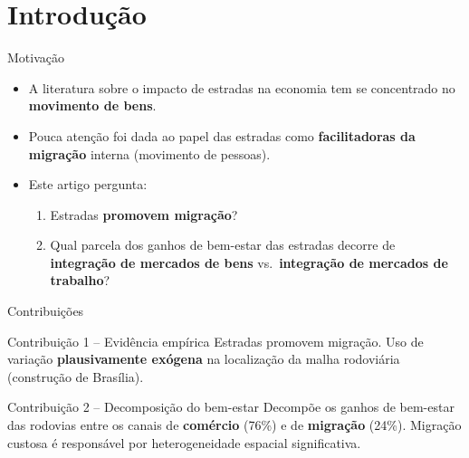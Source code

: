 
\begin{frame}
    \vspace{.8cm}
    \titlepage
\end{frame}

\section{Introdução}

\begin{frame}{Motivação}
    \begin{itemize}
        \item A literatura sobre o impacto de estradas na economia tem se concentrado no \textbf{movimento de bens}.
        \item Pouca atenção foi dada ao papel das estradas como \textbf{facilitadoras da migração} interna (movimento de pessoas).
        \item Este artigo pergunta:
        \begin{enumerate}
            \item Estradas \textbf{promovem migração}?
            \item Qual parcela dos ganhos de bem-estar das estradas decorre de \textbf{integração de mercados de bens} vs.\ \textbf{integração de mercados de trabalho}?
        \end{enumerate}
    \end{itemize}
\end{frame}

\begin{frame}{Contribuições}
    \begin{block}{Contribuição 1 -- Evidência empírica}
        Estradas promovem migração. Uso de variação \textbf{plausivamente exógena} na localização da malha rodoviária (construção de Brasília).
    \end{block}

    \vspace{.4cm}

    \begin{block}{Contribuição 2 -- Decomposição do bem-estar}
        Decompõe os ganhos de bem-estar das rodovias entre os canais de \textbf{comércio} (76\%) e de \textbf{migração} (24\%). Migração custosa é responsável por heterogeneidade espacial significativa.
    \end{block}
\end{frame}

